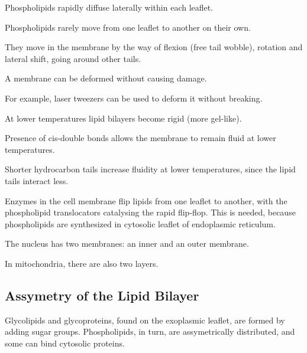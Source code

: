 \documentclass[11pt]{scrartcl}
\begin{document}
Phospholipids rapidly diffuse laterally within each leaflet.

Phospholipids rarely move from one leaflet to another on their own.

They move in the membrane by the way of flexion (free tail wobble),
rotation and lateral shift, going around other tails.

A membrane can be deformed without causing damage.

For example, laser tweezers can be used to deform it without breaking.

At lower temperatures lipid bilayers become rigid (more
gel-like).

Presence of cis-double bonds allows the membrane to remain
fluid at lower temperatures.

Shorter hydrocarbon tails increase fluidity at lower temperatures,
since the lipid tails interact less.

Enzymes in the cell membrane flip lipids from one leaflet to another,
with the phospholipid translocators catalysing the rapid
flip-flop. This is needed, because phospholipids are synthesized in
cytosolic leaflet of endoplasmic reticulum.

The nucleus has two membranes: an inner and an outer membrane.

In mitochondria, there are also two layers.

\subsection{Assymetry of the Lipid Bilayer}

Glycolipids and glycoproteins, found on the exoplasmic leaflet, are formed by adding sugar groups. Phospholipids, in turn, are assymetrically distributed, and some can bind cytosolic proteins.
\end{document}
